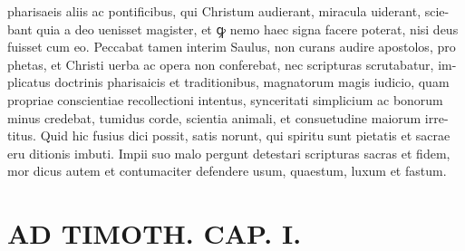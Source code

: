 \documentclass{article}
\begin{document}
\begin{pages}
pharisaeis aliis ac pontificibus, qui Christum audierant, miracula uiderant, scie- bant quia a deo uenisset magister, et ꝙ nemo haec signa facere poterat, nisi deus fuisset cum eo. Peccabat tamen interim Saulus, non curans audire apostolos, pro phetas, et Christi uerba ac opera non conferebat, nec scripturas scrutabatur, im- plicatus doctrinis pharisaicis et traditionibus, magnatorum magis iudicio, quam propriae conscientiae recollectioni intentus, synceritati simplicium ac bonorum minus credebat, tumidus corde, scientia animali, et consuetudine maiorum irre- titus. Quid hic fusius dici possit, satis norunt, qui spiritu sunt pietatis et sacrae eru ditionis imbuti. Impii suo malo pergunt detestari scripturas sacras et fidem, mor dicus autem et contumaciter defendere usum, quaestum, luxum et fastum.  \pend
\section*{AD TIMOTH. CAP. I. }
\marginpar{[ p.475 ]}
{}

\end{pages}
\end{document}
